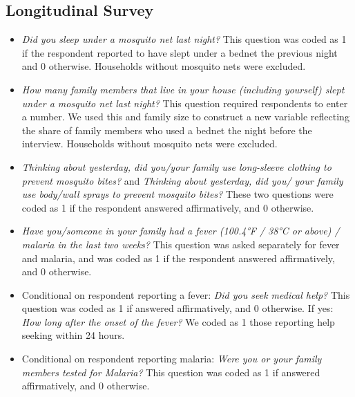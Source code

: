 \subsection{Longitudinal Survey}
    \begin{itemize}[noitemsep]
    \item[a)] \textit{Did you sleep under a mosquito net last night?} This question was coded as 1 if the respondent reported to have slept under a bednet the previous night and 0 otherwise. Households without mosquito nets were excluded.
    \item[b)] \textit{How many family members that live in your house (including yourself) slept under a mosquito net last night?} This question required respondents to enter a number. We used this and family size to construct a new variable reflecting the share of family members who used a bednet the night before the interview. Households without mosquito nets were excluded.
    \item[c)] \textit{Thinking about yesterday, did you/your family use long-sleeve clothing to prevent mosquito bites?} and \textit{Thinking about yesterday, did you/ your family use body/wall sprays to prevent mosquito bites?} These two questions were coded as 1 if the respondent answered affirmatively, and 0 otherwise.
    \item[d)] \textit{Have you/someone in your family had a fever (100.4°F / 38°C or above) / malaria in the last two weeks?} This question was asked separately for fever and malaria, and was coded as 1 if the respondent answered affirmatively, and 0 otherwise.
    \item[e)] Conditional on respondent reporting a fever: \textit{Did you seek medical help?} This question was coded as 1 if answered affirmatively, and 0 otherwise. If yes: \textit{How long after the onset of the fever?} We coded as 1 those reporting help seeking within 24 hours.
    \item[f)] Conditional on respondent reporting malaria: \textit{Were you or your family members tested for Malaria?} This question was coded as 1 if answered affirmatively, and 0 otherwise. 
\end{itemize} 

